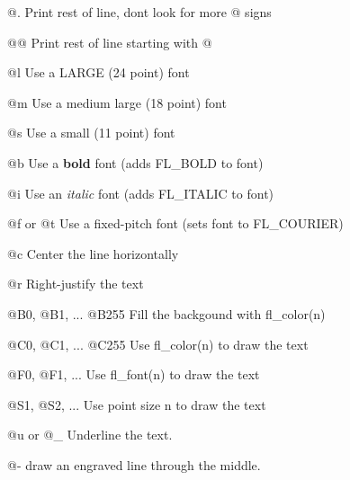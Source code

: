 \begin{DoxyItemize}
\item {\ttfamily \textquotesingle{}@.\textquotesingle{}} Print rest of line, don\textquotesingle{}t look for more \textquotesingle{}@\textquotesingle{} signs \item {\ttfamily \textquotesingle{}@@\textquotesingle{}} Print rest of line starting with \textquotesingle{}@\textquotesingle{} \item {\ttfamily \textquotesingle{}@l\textquotesingle{}} Use a L\+A\+R\+GE (24 point) font \item {\ttfamily \textquotesingle{}@m\textquotesingle{}} Use a medium large (18 point) font \item {\ttfamily \textquotesingle{}@s\textquotesingle{}} Use a 
\footnotesize small
\normalsize  (11 point) font \item {\ttfamily \textquotesingle{}@b\textquotesingle{}} Use a {\bfseries bold} font (adds F\+L\+\_\+\+B\+O\+LD to font) \item {\ttfamily \textquotesingle{}@i\textquotesingle{}} Use an {\itshape italic} font (adds F\+L\+\_\+\+I\+T\+A\+L\+IC to font) \item {\ttfamily \textquotesingle{}@f\textquotesingle{} or \textquotesingle{}@t\textquotesingle{}} Use a fixed-\/pitch font (sets font to F\+L\+\_\+\+C\+O\+U\+R\+I\+ER) \item {\ttfamily \textquotesingle{}@c\textquotesingle{}} Center the line horizontally \item {\ttfamily \textquotesingle{}@r\textquotesingle{}} Right-\/justify the text \item {\ttfamily \textquotesingle{}@B0\textquotesingle{}, \textquotesingle{}@B1\textquotesingle{}, ... \textquotesingle{}@B255\textquotesingle{}} Fill the backgound with fl\+\_\+color(n) \item {\ttfamily \textquotesingle{}@C0\textquotesingle{}, \textquotesingle{}@C1\textquotesingle{}, ... \textquotesingle{}@C255\textquotesingle{}} Use fl\+\_\+color(n) to draw the text \item {\ttfamily \textquotesingle{}@F0\textquotesingle{}, \textquotesingle{}@F1\textquotesingle{}, ...} Use fl\+\_\+font(n) to draw the text \item {\ttfamily \textquotesingle{}@S1\textquotesingle{}, \textquotesingle{}@S2\textquotesingle{}, ...} Use point size n to draw the text \item {\ttfamily \textquotesingle{}@u\textquotesingle{} or \textquotesingle{}@\+\_\+\textquotesingle{}} Underline the text. \item {\ttfamily \textquotesingle{}@-\/\textquotesingle{}} draw an engraved line through the middle.\end{DoxyItemize}
